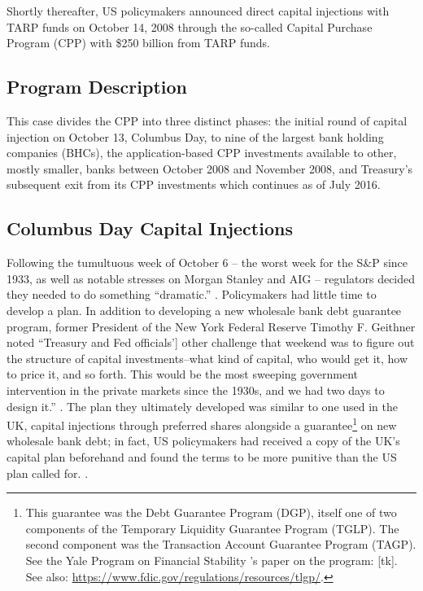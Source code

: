 \documentclass[12pt]{article}
\begin{document}
Shortly thereafter, US policymakers announced direct capital injections with TARP funds on October 14, 2008 through the so-called Capital Purchase Program (CPP) with \$250 billion from TARP funds. 

\subsection{Program Description}

This case divides the CPP into three distinct phases: the initial round of capital injection on October 13, Columbus Day, to nine of the largest bank holding companies (BHCs), the application-based CPP investments available to other, mostly smaller, banks between October 2008 and November 2008, and Treasury's subsequent exit from its CPP investments which continues as of July 2016. 

\subsection*{Columbus Day Capital Injections}

Following the tumultuous week of October 6 -- the worst week for the S\&P since 1933, as well as notable stresses on Morgan Stanley and AIG -- regulators decided they needed to do something ``dramatic.'' \citep{paulsonbook}. Policymakers had little time to develop a plan. In addition to developing a new wholesale bank debt guarantee program, former President of the New York Federal Reserve Timothy F. Geithner noted ``Treasury and Fed officials'] other challenge that weekend was to figure out the structure of capital investments--what kind of capital, who would get it, how to price it, and so forth. This would be the most sweeping government intervention in the private markets since the 1930s, and we had two days to design it.'' \citep{Geithner}. The plan they ultimately developed was similar to one used in the UK, capital injections through preferred shares alongside a guarantee\footnote{This guarantee was the Debt Guarantee Program (DGP), itself one of two components of the Temporary Liquidity Guarantee Program (TGLP). The second component was the Transaction Account Guarantee Program (TAGP). See the Yale Program on Financial Stability 's paper on the program: [tk]. See also:  \url{https://www.fdic.gov/regulations/resources/tlgp/}.} on new wholesale bank debt; in fact, US policymakers had received a copy of the UK's capital plan beforehand and found the terms to be more punitive than the US plan called for. \citep{paulsonbook}. 
\end{document}
